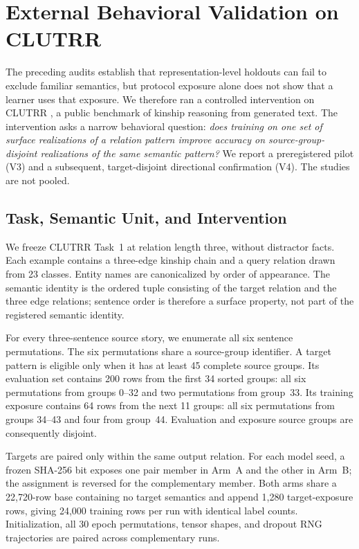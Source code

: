 \section{External Behavioral Validation on CLUTRR}
\label{sec:clutrr-external-validation}

The preceding audits establish that representation-level holdouts can fail to
exclude familiar semantics, but protocol exposure alone does not show that a
learner uses that exposure.  We therefore ran a controlled intervention on
CLUTRR \cite{sinha2019clutrr}, a public benchmark of kinship reasoning from
generated text.  The intervention asks a narrow behavioral question:
\emph{does training on one set of surface realizations of a relation pattern
improve accuracy on source-group-disjoint realizations of the same semantic
pattern?}  We report a preregistered pilot (V3) and a subsequent,
target-disjoint directional confirmation (V4).  The studies are not pooled.

\subsection{Task, Semantic Unit, and Intervention}

We freeze CLUTRR Task~1 at relation length three, without distractor facts.
Each example contains a three-edge kinship chain and a query relation drawn
from 23 classes.  Entity names are canonicalized by order of appearance.  The
semantic identity is the ordered tuple consisting of the target relation and
the three edge relations; sentence order is therefore a surface property, not
part of the registered semantic identity.

For every three-sentence source story, we enumerate all six sentence
permutations.  The six permutations share a source-group identifier.  A target
pattern is eligible only when it has at least 45 complete source groups.  Its
evaluation set contains 200 rows from the first 34 sorted groups: all six
permutations from groups 0--32 and two permutations from group~33.  Its
training exposure contains 64 rows from the next 11 groups: all six
permutations from groups 34--43 and four from group~44.  Evaluation and
exposure source groups are consequently disjoint.

Targets are paired only within the same output relation.  For each model
seed, a frozen SHA-256 bit exposes one pair member in Arm~A and the other in
Arm~B; the assignment is reversed for the complementary member.  Both arms
share a 22,720-row base containing no target semantics and append 1,280
target-exposure rows, giving 24,000 training rows per run with identical
label counts.  Initialization, all 30 epoch permutations, tensor shapes, and
dropout RNG trajectories are paired across complementary runs.

